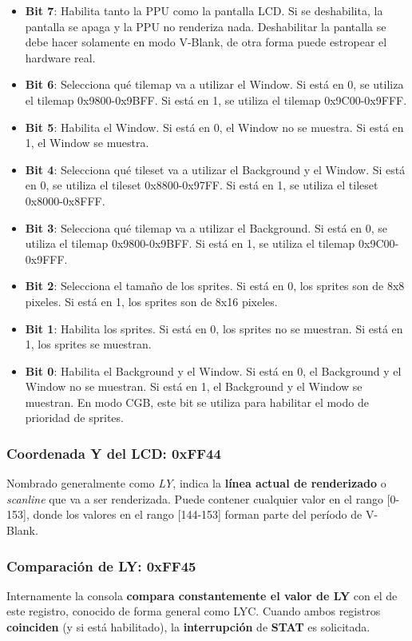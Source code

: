 \begin{itemize}
    \item \textbf{Bit 7}: Habilita tanto la PPU como la pantalla LCD. Si se deshabilita, la pantalla se apaga y la PPU no renderiza nada. Deshabilitar la pantalla se debe hacer solamente en modo V-Blank, de otra forma puede estropear el hardware real.
    \item \textbf{Bit 6}: Selecciona qué tilemap va a utilizar el Window. Si está en 0, se utiliza el tilemap 0x9800-0x9BFF. Si está en 1, se utiliza el tilemap 0x9C00-0x9FFF.
    \item \textbf{Bit 5}: Habilita el Window. Si está en 0, el Window no se muestra. Si está en 1, el Window se muestra.
    \item \textbf{Bit 4}: Selecciona qué tileset va a utilizar el Background y el Window. Si está en 0, se utiliza el tileset 0x8800-0x97FF. Si está en 1, se utiliza el tileset 0x8000-0x8FFF.
    \item \textbf{Bit 3}: Selecciona qué tilemap va a utilizar el Background. Si está en 0, se utiliza el tilemap 0x9800-0x9BFF. Si está en 1, se utiliza el tilemap 0x9C00-0x9FFF.
    \item \textbf{Bit 2}: Selecciona el tamaño de los sprites. Si está en 0, los sprites son de 8x8 pixeles. Si está en 1, los sprites son de 8x16 pixeles.
    \item \textbf{Bit 1}: Habilita los sprites. Si está en 0, los sprites no se muestran. Si está en 1, los sprites se muestran.
    \item \textbf{Bit 0}: Habilita el Background y el Window. Si está en 0, el Background y el Window no se muestran. Si está en 1, el Background y el Window se muestran. En modo CGB, este bit se utiliza para habilitar el modo de prioridad de sprites.
\end{itemize}

\subsubsection{Coordenada Y del LCD: 0xFF44}
Nombrado generalmente como \textit{LY}, indica la \textbf{línea actual de renderizado} o \textit{scanline} que va a ser renderizada. Puede contener cualquier valor en el rango [0-153], donde los valores en el rango [144-153] forman parte del período de V-Blank.

\subsubsection{Comparación de LY: 0xFF45}
Internamente la consola \textbf{compara constantemente el valor de LY} con el de este registro, conocido de forma general como LYC. Cuando ambos registros \textbf{coinciden} (y si está habilitado), la \textbf{interrupción} de \textbf{STAT} es solicitada.

